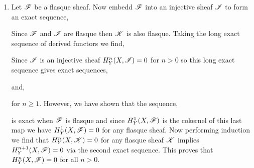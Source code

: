 \documentclass[12pt]{article}
\begin{document}
\begin{enumerate}
\item Let $\mathscr{F}$ be a flasque sheaf. Now embedd $\mathscr{F}$ into an injective sheaf $\mathscr{I}$ to form an exact sequence,
\begin{center}
\end{center}
Since $\mathscr{F}$ and $\mathscr{I}$ are flasque then $\mathscr{K}$ is also flasque.
Taking the long exact sequence of derived functors we find,
\begin{center}
\end{center}
Since $\mathscr{I}$ is an injective sheaf $H^n_Y(X, \mathscr{I}) = 0$ for $n > 0$ so this long exact sequence gives exact sequences,
\begin{center}
\end{center}
and,
\begin{center}
\end{center}
for $n \ge 1$. However, we have shown that the sequence,
\begin{center}
\end{center}
is exact when $\mathscr{F}$ is flasque and since $H_Y^1(X, \mathscr{F})$ is the cokernel of this last map we have $H^1_Y(X, \mathscr{F}) = 0$ for any flasque sheaf. Now performing induction we find that $H^n_Y(X, \mathscr{K}) = 0$ for any flasque sheaf $\mathscr{K}$ implies $H^{n+1}_Y(X, \mathscr{F}) = 0$ via the second exact sequence. This proves that $H^n_Y(X, \mathscr{F}) = 0$ for all $n > 0$. 


\end{enumerate}
\end{document}
